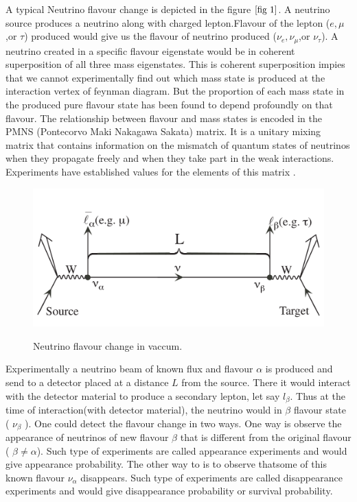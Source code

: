 A typical Neutrino flavour change is depicted in the figure $\ref*{fig 1}$. A neutrino source produces a neutrino along with charged lepton.Flavour of the lepton ($e,\mu$,or $\tau$) produced would give us the flavour of neutrino produced ($\nu_{e},\nu_{\mu}$,or $\nu_{\tau}$). A neutrino created in a specific flavour eigenstate would be in coherent superposition of all three mass eigenstates. This is coherent superposition impies that we cannot experimentally find out which mass state is produced at the interaction vertex of feynman diagram. But the proportion of each mass state in the produced pure flavour state has been found to depend profoundly on that flavour. The relationship between flavour and mass states is encoded in the PMNS (Pontecorvo Maki Nakagawa Sakata) matrix. It is a unitary mixing matrix that contains information on the mismatch of quantum states of neutrinos when they propagate freely and when they take part in the weak interactions. Experiments have established values for the elements of this matrix \cite{zyla}.\par
\begin{figure}[h]
\graphicspath{ {./Images/} }	
{\includegraphics[width=\textwidth]{fig_1.png}}
\centering

\caption{ Neutrino flavour change in vaccum\cite{kayser}.}
\label{fig 1}
\end{figure}


Experimentally a neutrino beam of known flux and flavour $\alpha$ is produced and send to a detector placed at a distance $L$ from the source. There it would interact with the detector material to produce a secondary lepton, let say $l_{\beta}$.  Thus at the time of interaction(with detector material), the neutrino would in $\beta$ flavour state ( $\nu_{\beta}$ ). One could detect the flavour change in two ways. One way is observe the appearance of neutrinos of new flavour $\beta$ that is different from the original flavour ( $\beta\neq\alpha$). Such type of experiments are called appearance experiments and would give appearance probability. The other way to is to observe thatsome of this known flavour $\nu_{\alpha}$ disappears. Such type of experiments are called disappearance experiments and would give disappearance probability or survival probability.
